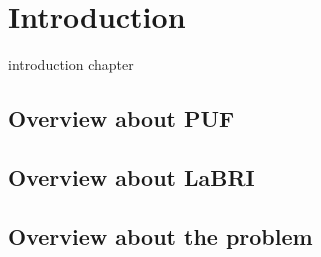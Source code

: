 \chapter{Introduction}
introduction chapter
\section{Overview about PUF}
\section{Overview about LaBRI}
\section{Overview about the problem}